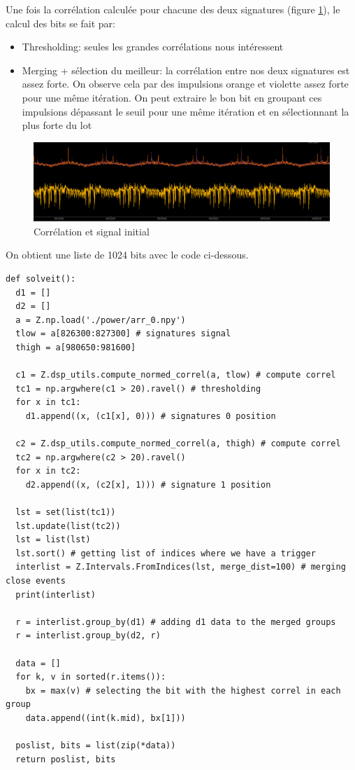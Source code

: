 \documentclass[14pt]{article}
\theoremstyle{definition}
\begin{document}
Une fois la corrélation calculée pour chacune des deux signatures (figure \ref{fig:p0_correl}), le calcul des bits se fait par:
\begin{itemize}
    \item Thresholding: seules les grandes corrélations nous intéressent
    \item Merging + sélection du meilleur: la corrélation entre nos deux signatures est assez forte. On observe cela par des impulsions orange et violette assez forte pour une même itération.
      On peut extraire le bon bit en groupant ces impulsions dépassant le seuil pour une même itération et en sélectionnant la plus forte du lot
\end{itemize}
\begin{figure}[H]
\centering
\includegraphics[width=1.0\textwidth]{./screenshots/p0_correl.png}
  \caption{Corrélation et signal initial}
  \label{fig:p0_correl}
\end{figure}

On obtient une liste de 1024 bits avec le code ci-dessous.

\begin{verbatim}
def solveit():
  d1 = []
  d2 = []
  a = Z.np.load('./power/arr_0.npy')
  tlow = a[826300:827300] # signatures signal
  thigh = a[980650:981600]

  c1 = Z.dsp_utils.compute_normed_correl(a, tlow) # compute correl
  tc1 = np.argwhere(c1 > 20).ravel() # thresholding
  for x in tc1:
    d1.append((x, (c1[x], 0))) # signatures 0 position

  c2 = Z.dsp_utils.compute_normed_correl(a, thigh) # compute correl
  tc2 = np.argwhere(c2 > 20).ravel()
  for x in tc2:
    d2.append((x, (c2[x], 1))) # signature 1 position

  lst = set(list(tc1))
  lst.update(list(tc2))
  lst = list(lst)
  lst.sort() # getting list of indices where we have a trigger
  interlist = Z.Intervals.FromIndices(lst, merge_dist=100) # merging close events
  print(interlist)

  r = interlist.group_by(d1) # adding d1 data to the merged groups
  r = interlist.group_by(d2, r)

  data = []
  for k, v in sorted(r.items()):
    bx = max(v) # selecting the bit with the highest correl in each group
    data.append((int(k.mid), bx[1]))

  poslist, bits = list(zip(*data))
  return poslist, bits
\end{verbatim}
\end{document}
